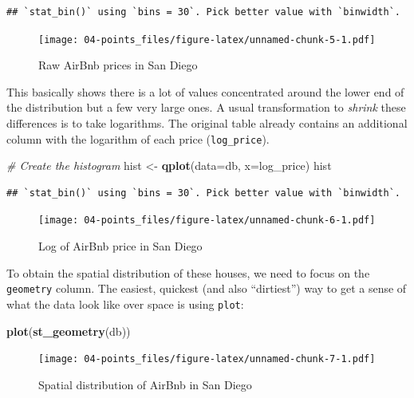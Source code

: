 \documentclass[
]{book}
\newenvironment{Shaded}{\begin{snugshade}}{\end{snugshade}}
\newcommand{\CommentTok}[1]{\textcolor[rgb]{0.56,0.35,0.01}{\textit{#1}}}
\newcommand{\DataTypeTok}[1]{\textcolor[rgb]{0.13,0.29,0.53}{#1}}
\newcommand{\KeywordTok}[1]{\textcolor[rgb]{0.13,0.29,0.53}{\textbf{#1}}}
\newcommand{\NormalTok}[1]{#1}
\newcommand{\StringTok}[1]{\textcolor[rgb]{0.31,0.60,0.02}{#1}}
\begin{document}
\begin{verbatim}
## `stat_bin()` using `bins = 30`. Pick better value with `binwidth`.
\end{verbatim}

\begin{figure}
\centering
\texttt{[image: 04-points\_files/figure-latex/unnamed-chunk-5-1.pdf]}
\caption{\label{fig:unnamed-chunk-5}Raw AirBnb prices in San Diego}
\end{figure}

This basically shows there is a lot of values concentrated around the lower end of the distribution but a few very large ones. A usual transformation to \emph{shrink} these differences is to take logarithms. The original table already contains an additional column with the logarithm of each price (\texttt{log\_price}).

\begin{Shaded}
\begin{Highlighting}[]
\CommentTok{# Create the histogram}
\NormalTok{hist <-}\StringTok{ }\KeywordTok{qplot}\NormalTok{(}\DataTypeTok{data=}\NormalTok{db, }\DataTypeTok{x=}\NormalTok{log_price)}
\NormalTok{hist}
\end{Highlighting}
\end{Shaded}

\begin{verbatim}
## `stat_bin()` using `bins = 30`. Pick better value with `binwidth`.
\end{verbatim}

\begin{figure}
\centering
\texttt{[image: 04-points\_files/figure-latex/unnamed-chunk-6-1.pdf]}
\caption{\label{fig:unnamed-chunk-6}Log of AirBnb price in San Diego}
\end{figure}

To obtain the spatial distribution of these houses, we need to focus on the \texttt{geometry} column. The easiest, quickest (and also ``dirtiest'') way to get a sense of what the data look like over space is using \texttt{plot}:

\begin{Shaded}
\begin{Highlighting}[]
\KeywordTok{plot}\NormalTok{(}\KeywordTok{st_geometry}\NormalTok{(db))}
\end{Highlighting}
\end{Shaded}

\begin{figure}
\centering
\texttt{[image: 04-points\_files/figure-latex/unnamed-chunk-7-1.pdf]}
\caption{\label{fig:unnamed-chunk-7}Spatial distribution of AirBnb in San Diego}
\end{figure}
\end{document}
